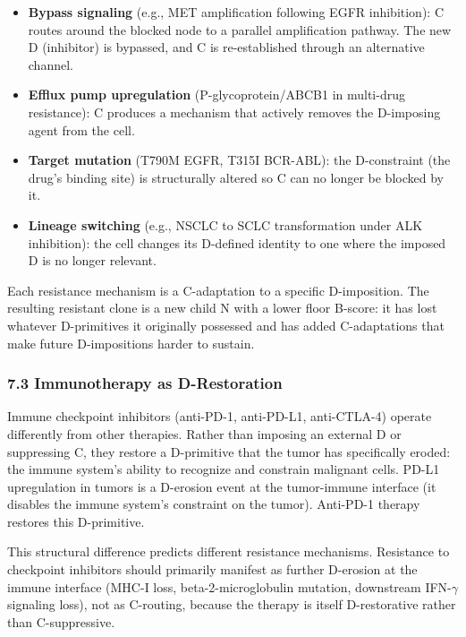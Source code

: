 \documentclass[
  11pt,
  letterpaper,
]{article}
\providecommand{\tightlist}{%
  \setlength{\itemsep}{0pt}\setlength{\parskip}{0pt}}
\begin{document}
\begin{itemize}
\tightlist
\item
  \textbf{Bypass signaling} (e.g., MET amplification following EGFR
  inhibition): C routes around the blocked node to a parallel
  amplification pathway. The new D (inhibitor) is bypassed, and C is
  re-established through an alternative channel.
\item
  \textbf{Efflux pump upregulation} (P-glycoprotein/ABCB1 in multi-drug
  resistance): C produces a mechanism that actively removes the
  D-imposing agent from the cell.
\item
  \textbf{Target mutation} (T790M EGFR, T315I BCR-ABL): the D-constraint
  (the drug's binding site) is structurally altered so C can no longer
  be blocked by it.
\item
  \textbf{Lineage switching} (e.g., NSCLC to SCLC transformation under
  ALK inhibition): the cell changes its D-defined identity to one where
  the imposed D is no longer relevant.
\end{itemize}

Each resistance mechanism is a C-adaptation to a specific D-imposition.
The resulting resistant clone is a new child N with a lower floor
B-score: it has lost whatever D-primitives it originally possessed and
has added C-adaptations that make future D-impositions harder to
sustain.

\subsubsection{7.3 Immunotherapy as
D-Restoration}\label{immunotherapy-as-d-restoration}

Immune checkpoint inhibitors (anti-PD-1, anti-PD-L1, anti-CTLA-4)
operate differently from other therapies. Rather than imposing an
external D or suppressing C, they restore a D-primitive that the tumor
has specifically eroded: the immune system's ability to recognize and
constrain malignant cells. PD-L1 upregulation in tumors is a D-erosion
event at the tumor-immune interface (it disables the immune system's
constraint on the tumor). Anti-PD-1 therapy restores this D-primitive.

This structural difference predicts different resistance mechanisms.
Resistance to checkpoint inhibitors should primarily manifest as further
D-erosion at the immune interface (MHC-I loss, beta-2-microglobulin
mutation, downstream IFN-\(\gamma\) signaling loss), not as C-routing,
because the therapy is itself D-restorative rather than C-suppressive.
\end{document}
